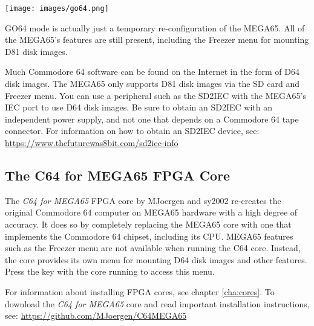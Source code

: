 \begin{center}
  \texttt{[image: images/go64.png]}
\end{center}

GO64 mode is actually just a temporary re-configuration of the MEGA65. All of the MEGA65's features are still present, including the Freezer menu for mounting D81 disk images.

Much Commodore 64 software can be found on the Internet in the form of D64 disk images. The MEGA65 only supports D81 disk images via the SD card and Freezer menu. You can use a peripheral such as the SD2IEC with the MEGA65's IEC port to use D64 disk images. Be sure to obtain an SD2IEC with an independent power supply, and not one that depends on a Commodore 64 tape connector. For information on how to obtain an SD2IEC device, see: \url{https://www.thefuturewas8bit.com/sd2iec-info}

\subsection{The C64 for MEGA65 FPGA Core}

The {\it C64 for MEGA65} FPGA core by MJoergen and sy2002 re-creates the original Commodore 64 computer on MEGA65 hardware with a high degree of accuracy. It does so by completely replacing the MEGA65 core with one that implements the Commodore 64 chipset, including its CPU. MEGA65 features such as the Freezer menu are not available when running the C64 core. Instead, the core provides its own menu for mounting D64 disk images and other features. Press the  key with the core running to access this menu.


For information about installing FPGA cores, see chapter \vref{cha:cores}. To download the {\it C64 for MEGA65} core and read important installation instructions, see: \url{https://github.com/MJoergen/C64MEGA65}
